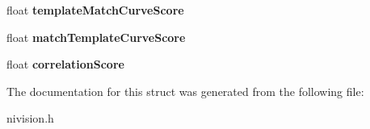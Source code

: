 \begin{DoxyCompactItemize}
\item 
\hypertarget{structGeometricPatternMatch__struct_ace18aec32a6f1352f485620a6a643aa6}{
float {\bfseries templateMatchCurveScore}}
\label{structGeometricPatternMatch__struct_ace18aec32a6f1352f485620a6a643aa6}

\item 
\hypertarget{structGeometricPatternMatch__struct_ad9368f6cac538863bf062b21f4fea647}{
float {\bfseries matchTemplateCurveScore}}
\label{structGeometricPatternMatch__struct_ad9368f6cac538863bf062b21f4fea647}

\item 
\hypertarget{structGeometricPatternMatch__struct_afed75175193eb0b4a23888914529e8f1}{
float {\bfseries correlationScore}}
\label{structGeometricPatternMatch__struct_afed75175193eb0b4a23888914529e8f1}

\end{DoxyCompactItemize}


The documentation for this struct was generated from the following file:\begin{DoxyCompactItemize}
\item 
nivision.h\end{DoxyCompactItemize}
